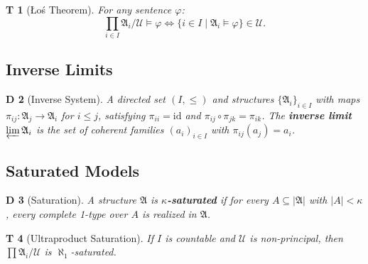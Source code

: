 \documentclass[12pt,a4paper]{article}
\newtheorem{theorem}Theorem[section]
\newtheorem{definition}[theorem]Definition
\theoremstyle{remark}
\newcommand{\Ultrafilter}{\mathcal{U}}
\newcommand{\Struct}{\mathfrak{A}}
\begin{document}
\begin{theorem}[Łoś Theorem]
For any sentence \(\varphi\):
\[
    \prod_{i \in I} \Struct_i / \Ultrafilter \models \varphi
    \iff \{i \in I \mid \Struct_i \models \varphi\} \in \Ultrafilter.
\]
\end{theorem}

\subsection{Inverse Limits}
\begin{definition}[Inverse System]
A directed set \((I, \leq)\) and structures \(\{\Struct_i\}_{i \in I}\) with maps \(\pi_{ij}: \Struct_j \to \Struct_i\) for \(i \leq j\), satisfying \(\pi_{ii} = \mathrm{id}\) and \(\pi_{ij} \circ \pi_{jk} = \pi_{ik}\). The \textbf{inverse limit} \(\varprojlim \Struct_i\) is the set of coherent families \((a_i)_{i \in I}\) with \(\pi_{ij}(a_j) = a_i\).
\end{definition}

\subsection{Saturated Models}
\begin{definition}[Saturation]
A structure \(\Struct\) is \textbf{\(\kappa\)-saturated} if for every \(A \subseteq |\Struct|\) with \(|A| < \kappa\), every complete 1-type over \(A\) is realized in \(\Struct\).
\end{definition}

\begin{theorem}[Ultraproduct Saturation]
If \(I\) is countable and \(\Ultrafilter\) is non-principal, then \(\prod \Struct_i / \Ultrafilter\) is \(\aleph_1\)-saturated.
\end{theorem}
\end{document}
